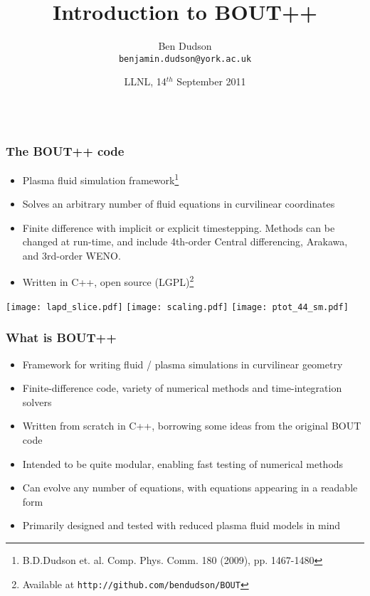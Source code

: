 \documentclass{beamer}
\begin{document}
\title[Introduction to BOUT++ (\insertframenumber\ of \inserttotalframenumber)]{Introduction to BOUT++}
\author{Ben Dudson\\
\texttt{benjamin.dudson@york.ac.uk}}

\date{LLNL, 14$^{th}$ September 2011\\
\\
 \hspace{0.05\textwidth}}
\begin{frame}
\titlepage
\end{frame}

\begin{frame}
  \frametitle{The BOUT++ code}
  
  \begin{itemize}
    \item Plasma fluid simulation framework\footnote{B.D.Dudson et. al. Comp. Phys. Comm. 180 (2009), pp. 1467-1480}
    \item Solves an arbitrary number of fluid equations in curvilinear coordinates
    \item Finite difference with implicit or explicit timestepping.
      Methods can be changed at run-time, and include 4th-order Central differencing, Arakawa, and 3rd-order WENO.
    \item Written in C++, open source (LGPL)\footnote{Available at \texttt{http://github.com/bendudson/BOUT}}
  \end{itemize}

  \texttt{[image: lapd\_slice.pdf]}
  \texttt{[image: scaling.pdf]}
  \texttt{[image: ptot\_44\_sm.pdf]}
\end{frame}

\begin{frame}
  \frametitle{What is BOUT++}
  
  \begin{itemize}
  \item Framework for writing fluid / plasma simulations in curvilinear geometry
  \item Finite-difference code, variety of numerical methods and time-integration solvers
  \item Written from scratch in C++, borrowing some ideas from the original
    BOUT code
  \item Intended to be quite modular, enabling fast testing of numerical methods
  \item Can evolve any number of equations, with equations appearing in a readable form
  \item Primarily designed and tested with reduced plasma fluid models in mind
  \end{itemize}
  
\end{frame}
\end{document}
